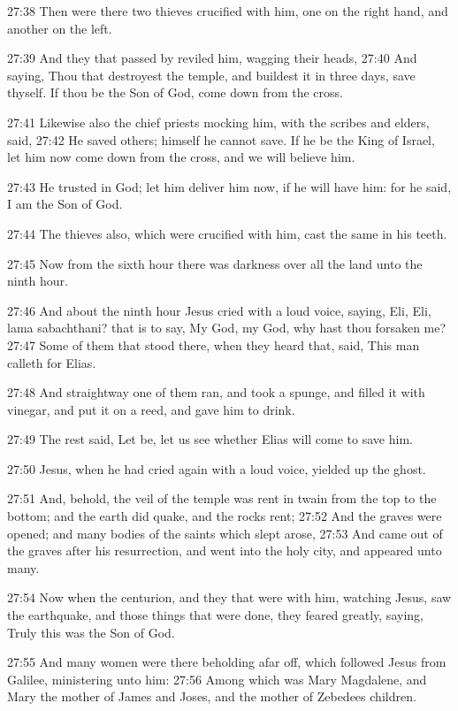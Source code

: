 27:38 Then were there two thieves crucified with him, one on the right hand, and another on the left.

27:39 And they that passed by reviled him, wagging their heads, 27:40 And saying, Thou that destroyest the temple, and buildest it in three days, save thyself. If thou be the Son of God, come down from the cross.

27:41 Likewise also the chief priests mocking him, with the scribes and elders, said, 27:42 He saved others; himself he cannot save. If he be the King of Israel, let him now come down from the cross, and we will believe him.

27:43 He trusted in God; let him deliver him now, if he will have him: for he said, I am the Son of God.

27:44 The thieves also, which were crucified with him, cast the same in his teeth.

27:45 Now from the sixth hour there was darkness over all the land unto the ninth hour.

27:46 And about the ninth hour Jesus cried with a loud voice, saying, Eli, Eli, lama sabachthani? that is to say, My God, my God, why hast thou forsaken me?  27:47 Some of them that stood there, when they heard that, said, This man calleth for Elias.

27:48 And straightway one of them ran, and took a spunge, and filled it with vinegar, and put it on a reed, and gave him to drink.

27:49 The rest said, Let be, let us see whether Elias will come to save him.

27:50 Jesus, when he had cried again with a loud voice, yielded up the ghost.

27:51 And, behold, the veil of the temple was rent in twain from the top to the bottom; and the earth did quake, and the rocks rent; 27:52 And the graves were opened; and many bodies of the saints which slept arose, 27:53 And came out of the graves after his resurrection, and went into the holy city, and appeared unto many.

27:54 Now when the centurion, and they that were with him, watching Jesus, saw the earthquake, and those things that were done, they feared greatly, saying, Truly this was the Son of God.

27:55 And many women were there beholding afar off, which followed Jesus from Galilee, ministering unto him: 27:56 Among which was Mary Magdalene, and Mary the mother of James and Joses, and the mother of Zebedees children.

